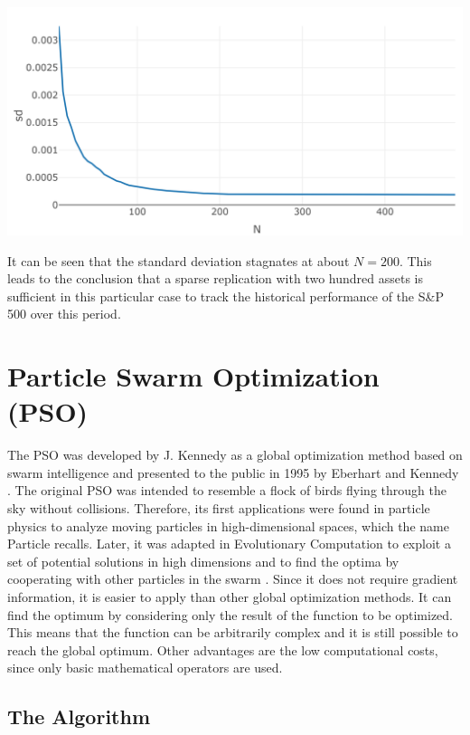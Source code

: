 \documentclass[
  oneside]{book}
\begin{document}
\includegraphics{Master_Thesis_files/figure-latex/qp_itp4-1.png}

It can be seen that the standard deviation stagnates at about \(N=200\). This leads to the conclusion that a sparse replication with two hundred assets is sufficient in this particular case to track the historical performance of the S\&P 500 over this period.

\hypertarget{particle-swarm-optimization-pso}{%
\chapter{Particle Swarm Optimization (PSO)}\label{particle-swarm-optimization-pso}}

The PSO was developed by J. Kennedy as a global optimization method based on swarm intelligence and presented to the public in 1995 by Eberhart and Kennedy \citep{KeEb1995}. The original PSO was intended to resemble a flock of birds flying through the sky without collisions. Therefore, its first applications were found in particle physics to analyze moving particles in high-dimensional spaces, which the name Particle recalls. Later, it was adapted in Evolutionary Computation to exploit a set of potential solutions in high dimensions and to find the optima by cooperating with other particles in the swarm \citep{PaVr2002}. Since it does not require gradient information, it is easier to apply than other global optimization methods. It can find the optimum by considering only the result of the function to be optimized. This means that the function can be arbitrarily complex and it is still possible to reach the global optimum. Other advantages are the low computational costs, since only basic mathematical operators are used.

\hypertarget{the-algorithm}{%
\section{The Algorithm}\label{the-algorithm}}
\end{document}

